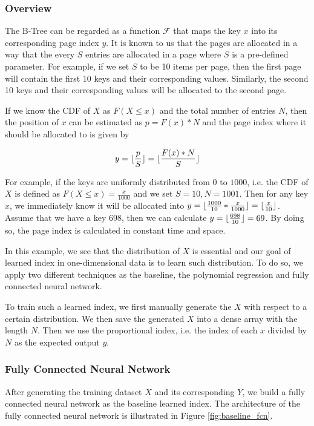\subsubsection{Overview}

The B-Tree can be regarded as a function $\mathcal{F}$ that maps the key $x$ into its corresponding page index $y$. It is known to us that the pages are allocated in a way that the every $S$ entries are allocated in a page where $S$ is a pre-defined parameter. For example, if we set $S$ to be 10 items per page, then the first page will contain the first 10 keys and their corresponding values. Similarly, the second 10 keys and their corresponding values will be allocated to the second page.

If we know the CDF of $X$ as $F(X\leq x)$ and the total number of entries $N$, then the position of $x$ can be estimated as $p=F(x)*N$ and the page index where it should be allocated to is given by

$$y=\lfloor\frac{p}{S}\rfloor=\lfloor\frac{F(x)*N}{S}\rfloor$$  

\begin{mscexample}
For example, if the keys are uniformly distributed from $0$ to $1000$, i.e. the CDF of $X$ is defined as $F(X\leq x)=\frac{x}{1000}$ and we set $S=10, N=1001$. Then for any key $x$, we immediately know it will be allocated into $y=\lfloor\frac{1000}{10}*\frac{x}{1000}\rfloor=\lfloor\frac{x}{10}\rfloor$. Assume that we have a key $698$, then we can calculate $y=\lfloor\frac{698}{10}\rfloor=69$. By doing so, the page index is calculated in constant time and space.

In this example, we see that the distribution of $X$ is essential and our goal of learned index in one-dimensional data is to learn such distribution. To do so, we apply two different techniques as the baseline, the polynomial regression and fully connected neural network.
\end{mscexample}

To train such a learned index, we first manually generate the $X$ with respect to a certain distribution. We then save the generated $X$ into a dense array with the length $N$. Then we use the proportional index, i.e. the index of each $x$ divided by $N$ as the expected output $y$.
 
\subsubsection{Fully Connected Neural Network}

After generating the training dataset $X$ and its corresponding $Y$, we build a fully connected neural network as the baseline learned index. The architecture of the fully connected neural network is illustrated in Figure \ref{fig:baseline_fcn}.

